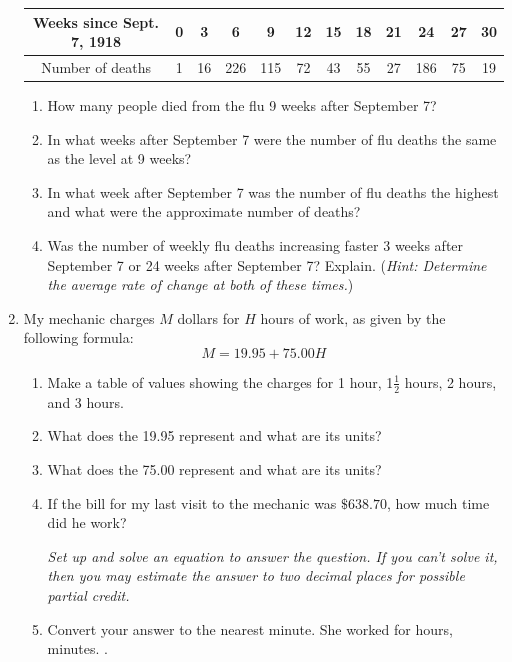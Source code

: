 \documentclass[12pt]{article}
\begin{document}
\begin{enumerate}
\begin{tabular} {|c|c|c|c|c |c|c|c|c|c |c|c|} \hline
Weeks since Sept. 7, 1918 & 0 & 3 & 6  & 9  & 12  & 15  & 18 & 21  & 24  & 27  & 30 \\ \hline
Number of deaths &1 & 16 & 226 & 115 & 72 & 43 & 55 & 27 & 186 & 75 & 19 \\ \hline
\end{tabular}

\begin{enumerate}
\item How many people died from the flu 9 weeks after September 7?
\vfill
\item In what weeks after September 7 were the number of flu deaths the same as the level at 9 weeks?
\vfill
\item In what week after September 7 was the number of flu deaths the highest and what were the approximate number of deaths?
\vfill
\item Was the number of weekly flu deaths increasing faster 3 weeks after September 7 or 24 weeks after September 7?  Explain. (\emph{Hint: Determine the average rate of change at both of these times.})
\vfill
\end{enumerate}

\newpage %

\item My mechanic charges $M$ dollars for $H$ hours of work, as given by the following formula:
$$M = 19.95 + 75.00H$$

\begin{enumerate}
\item Make a table of values showing the charges for 1 hour, 1$\frac{1}{2}$ hours, 2 hours, and 3 hours.
\vfill
\item What does the 19.95 represent and what are its units?
\vfill
\item What does the 75.00 represent and what are its units?
\vfill
\item If the bill for my last visit to the mechanic was $\$638.70$, how much time did he work?

\emph{Set up and solve an equation to answer the question.  If you can't solve it, then you may estimate the answer to two decimal places for possible partial credit.}
\vfill
\vfill
\vfill
\item Convert your answer to the nearest minute.
\vfill
She worked for \hrulefill hours, \hrulefill minutes. \hspace{3in}.
\end{enumerate}


\end{enumerate}
\end{document}

